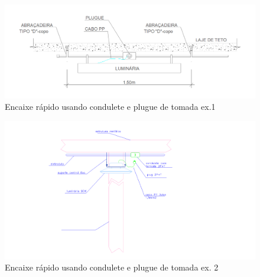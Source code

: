 \begin{enumerate}
		\begin{figure}[H]
			\centering
			\includegraphics[width=\textwidth]{Figures/3. Lighting/light-engate rapido1.png}
			\hfill
			\caption{Encaixe rápido usando condulete e plugue de tomada ex.1}
			\label{fig: engate-rapido1}
		\end{figure}
		\begin{figure}[H]
			\centering
			\includegraphics[scale=0.25]{Figures/3. Lighting/light-engate rapido2.png}
			\hfill
			\caption{Encaixe rápido usando condulete e plugue de tomada ex. 2}
			\label{fig: engate-rapido2}
		\end{figure}
	\end{enumerate}